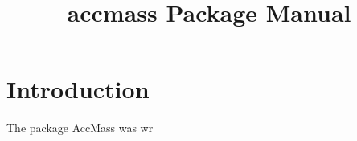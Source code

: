 \documentclass[a4paper,10pt]{article}
\title{accmass Package Manual}
\author{}
\begin{document}
\maketitle

\begin{abstract}

\end{abstract}

\section{Introduction}

The package AccMass was wr
\end{document}
